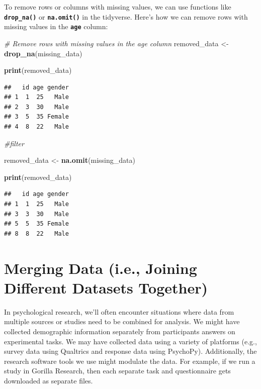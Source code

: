 \documentclass[
]{book}
\newenvironment{Shaded}{\begin{snugshade}}{\end{snugshade}}
\newcommand{\CommentTok}[1]{\textcolor[rgb]{0.56,0.35,0.01}{\textit{#1}}}
\newcommand{\FunctionTok}[1]{\textcolor[rgb]{0.13,0.29,0.53}{\textbf{#1}}}
\newcommand{\NormalTok}[1]{#1}
\newcommand{\OtherTok}[1]{\textcolor[rgb]{0.56,0.35,0.01}{#1}}
\begin{document}
To remove rows or columns with missing values, we can use functions like \textbf{\texttt{drop\_na()}} or \textbf{\texttt{na.omit()}} in the tidyverse. Here's how we can remove rows with missing values in the \textbf{\texttt{age}} column:

\begin{Shaded}
\begin{Highlighting}[]
\CommentTok{\# Remove rows with missing values in the age column}
\NormalTok{removed\_data }\OtherTok{\textless{}{-}} \FunctionTok{drop\_na}\NormalTok{(missing\_data)}

\FunctionTok{print}\NormalTok{(removed\_data)}
\end{Highlighting}
\end{Shaded}

\begin{verbatim}
##   id age gender
## 1  1  25   Male
## 2  3  30   Male
## 3  5  35 Female
## 4  8  22   Male
\end{verbatim}

\begin{Shaded}
\begin{Highlighting}[]
\CommentTok{\#filter}

\NormalTok{removed\_data }\OtherTok{\textless{}{-}} \FunctionTok{na.omit}\NormalTok{(missing\_data)}

\FunctionTok{print}\NormalTok{(removed\_data)}
\end{Highlighting}
\end{Shaded}

\begin{verbatim}
##   id age gender
## 1  1  25   Male
## 3  3  30   Male
## 5  5  35 Female
## 8  8  22   Male
\end{verbatim}

\section{Merging Data (i.e., Joining Different Datasets Together)}\label{merging-data-i.e.-joining-different-datasets-together}

In psychological research, we'll often encounter situations where data from multiple sources or studies need to be combined for analysis. We might have collected demographic information separately from participants answers on experimental tasks. We may have collected data using a variety of platforms (e.g., survey data using Qualtrics and response data using PsychoPy). Additionally, the research software tools we use might modulate the data. For example, if we run a study in Gorilla Research, then each separate task and questionnaire gets downloaded as separate files.
\end{document}
